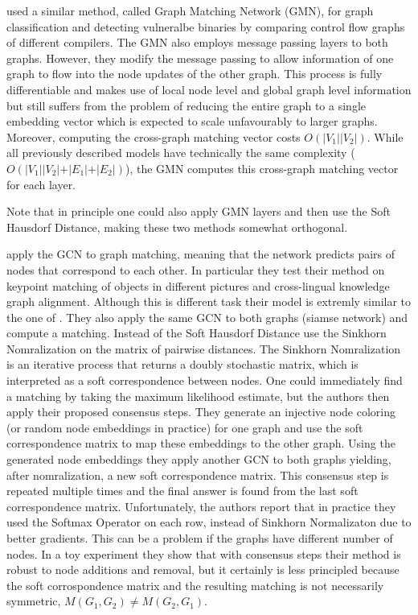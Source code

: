 \cite{li2019} used a similar method, called Graph Matching Network (GMN), for graph classification and detecting vulneralbe binaries by comparing control flow graphs of different compilers. The GMN also employs message passing layers to both graphs. However, they modify the message passing to allow information of one graph to flow into the node updates of the other graph. %
This process is fully differentiable and makes use of local node level and global graph level information but still suffers from the problem of reducing the entire graph to a single embedding vector which is expected to scale unfavourably to larger graphs. Moreover, computing the cross-graph matching vector costs $O(\vert V_1 \vert \vert V_2 \vert)$. While all previously described models have technically the same complexity ($O(\vert V_1 \vert \vert V_2 \vert + \vert E_1 \vert + \vert E_2 \vert)$), the GMN computes this cross-graph matching vector for each layer.

Note that in principle one could also apply GMN layers and then use the Soft Hausdorf Distance, making these two methods somewhat orthogonal.

\cite{fey2020_update} apply the GCN to graph matching, meaning that the network predicts pairs of nodes that correspond to each other. In particular they test their method on keypoint matching of objects in different pictures and cross-lingual knowledge graph alignment. Although this is different task their model is extremly similar to the one of \cite{riba2018}. They also apply the same GCN to both graphs (siamse network) and compute a matching. Instead of the Soft Hausdorf Distance \cite{fey2020_update} use the Sinkhorn Nomralization \cite{sinkhorn2013} on the matrix of pairwise distances. The Sinkhorn Nomralization is an iterative process that returns a doubly stochastic matrix, which is interpreted as a soft correspondence between nodes. One could immediately find a matching by taking the maximum likelihood estimate, but the authors then apply their proposed consensus steps. They generate an injective node coloring (or random node embeddings in practice) for one graph and use the soft correspondence matrix to map these embeddings to the other graph. Using the generated node embeddings they apply another GCN to both graphs yielding, after nomralization, a new soft correspondence matrix. This consensus step is repeated multiple times and the final answer is found from the last soft correspondence matrix. Unfortunately, the authors report that in practice they used the Softmax Operator on each row, instead of Sinkhorn Normalizaton due to better gradients. This can be a problem if the graphs have different number of nodes. In a toy experiment they show that with consensus steps their method is robust to node additions and removal, but it certainly is less principled because the soft corrospondence matrix and the resulting matching is not necessarily symmetric, $M(G_1, G_2) \neq M(G_2, G_1)$.





